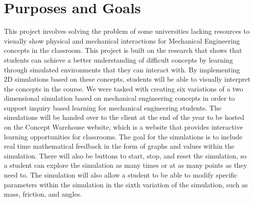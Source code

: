 \documentclass[onecolumn, draftclsnofoot,10pt, compsoc]{IEEEtran}
\begin{document}

\section{Purposes and Goals}
This project involves solving the problem of some universities lacking resources to visually show physical and mechanical interactions for Mechanical Engineering concepts in the classroom.
This project is built on the research that shows that students can achieve a better understanding of difficult concepts by learning through simulated environments that they can interact with. By implementing 2D simulations based on these concepts, students will be able to visually interpret the concepts in the course. We were tasked with creating six variations of a two dimensional simulation based on mechanical engineering concepts in order to support inquiry based learning for mechanical engineering students. The simulations will be handed over to the client at the end of the year to be hosted on the Concept Warehouse website, which is a website that provides interactive learning opportunities for classrooms. The goal for the simulations is to include real time mathematical feedback in the form of graphs and values within the simulation. There will also be buttons to start, stop, and reset the simulation, so a student can explore the simulation as many times or at as many points as they need to. The simulation will also allow  a student to be able to modify specific parameters within the simulation in the sixth variation of the simulation, such as mass, friction, and angles.
\end{document}
